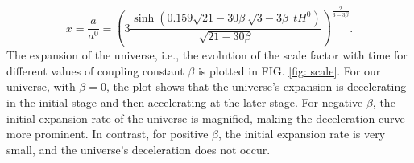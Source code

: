 \documentclass[preprint,aps,floatfix]{revtex4}
\begin{document}
    \begin{equation}
        x = \frac{a}{a^0} = \left(3\frac{\sinh \left(0.159 \sqrt{21-30 \beta} \sqrt{3-3\beta} ~tH^0\right)}{\sqrt{21-30 \beta}}\right)^{\displaystyle\frac{2}{3-3\beta}}.
    \end{equation}
    The expansion of the universe, i.e., the evolution of the scale factor with time for different values of coupling constant $\beta$ is plotted in FIG. \ref{fig: scale}.
%
    For our universe, with $\beta = 0$, the plot shows that the universe's expansion is decelerating in the initial stage and then accelerating at the later stage. For negative $\beta$, the initial expansion rate of the universe is magnified, making the deceleration curve more prominent. In contrast, for positive $\beta$, the initial expansion rate is very small, and the universe's deceleration does not occur.
    
\end{document}
